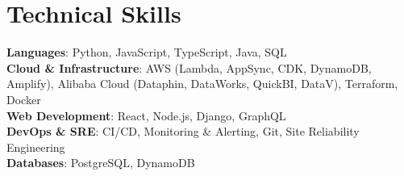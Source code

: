 \section{Technical Skills}
 \begin{itemize}[leftmargin=0.15in, label={}]
    \small{\item{
     \textbf{Languages}{: Python, JavaScript, TypeScript, Java, SQL} \\
     \textbf{Cloud \& Infrastructure}{: AWS (Lambda, AppSync, CDK, DynamoDB, Amplify), Alibaba Cloud (Dataphin, DataWorks, QuickBI, DataV), Terraform, Docker} \\
     \textbf{Web Development}{: React, Node.js, Django, GraphQL} \\
     \textbf{DevOps \& SRE}{: CI/CD, Monitoring \& Alerting, Git, Site Reliability Engineering} \\
     \textbf{Databases}{: PostgreSQL, DynamoDB}
    }}
 \end{itemize}

